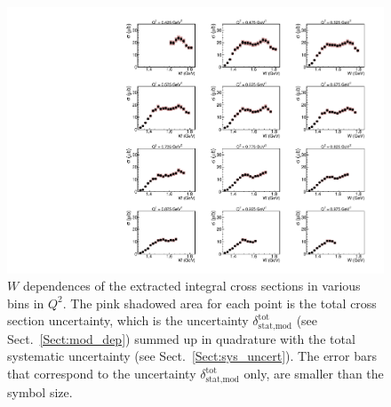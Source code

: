 
\begin{figure}[htp]
\begin{center}
\includegraphics[width=\textwidth]{pictures/conclusion/w_dep_new.pdf}
\caption{\small $W$ dependences of the extracted integral cross sections in various bins in $Q^{2}$. The pink shadowed area for each point is the total cross section uncertainty, which is the uncertainty $\delta_{\text{stat,mod}}^{\text{tot}}$ (see Sect.~\ref{Sect:mod_dep}) summed up in quadrature with the total systematic uncertainty (see Sect.~\ref{Sect:sys_uncert}). The error bars that correspond to the uncertainty $\delta_{\text{stat,mod}}^{\text{tot}}$ only, are smaller than the symbol size.   } \label{fig:int_w_dep}
\end{center}
\end{figure}


